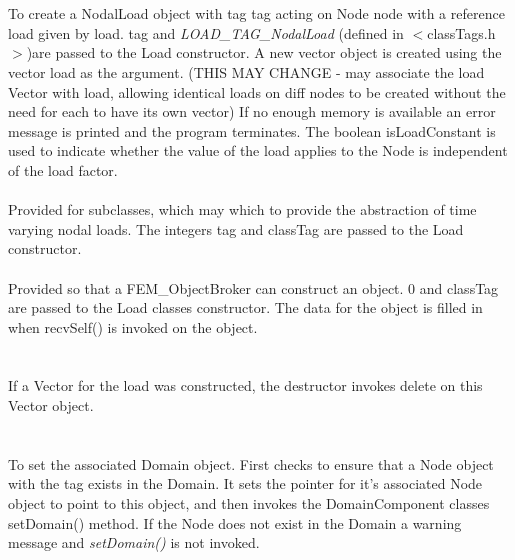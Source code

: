   \\
  \\
To create a NodalLoad object with tag \p tag acting on Node \p node with a
reference load given by \p load. \p tag and {\em LOAD\_TAG\_NodalLoad} (defined in
$<$classTags.h$>$)are passed to the Load constructor.  A new vector object is created using
the vector \p load as the argument. (THIS MAY CHANGE - may associate
the load Vector with \p load, allowing identical loads on diff
nodes to be created without the need for each to have its own
vector) If no enough memory is available an error message is printed
and the program terminates. The boolean \p isLoadConstant is used
to indicate whether the value of the load applies to the Node is
independent of the load factor. \\ 

  \\
Provided for subclasses, which may which to provide the abstraction of
time varying nodal loads. The integers \p tag and \p classTag
are passed to the Load constructor. \\

  \\
Provided so that a FEM\_ObjectBroker can construct an object. $0$ and
\p classTag are passed to the Load classes constructor. The data
for the object is filled in when recvSelf() is invoked on the
object.\\

  \\
 \\ 
If a Vector for the load was constructed, the destructor invokes
delete on this Vector object. \\


  \\
 \\
To set the associated Domain object. First checks to ensure that a
Node object with the tag exists in the Domain. It sets the pointer for
it's associated Node object to point to this object, and then 
invokes the DomainComponent classes setDomain() method. If the
Node does not exist in the Domain a warning message and {\em
setDomain()} is not invoked. \\


